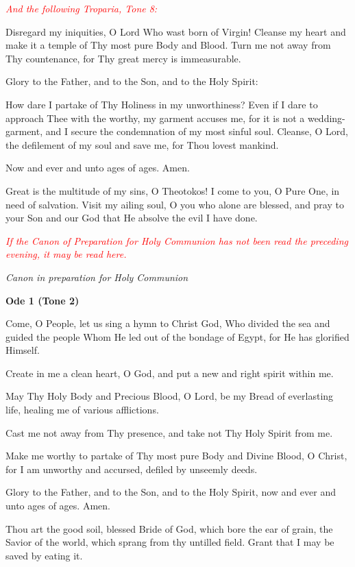 \textcolor{red}{\textit{And the following Troparia, Tone 8:}}

Disregard my iniquities, O Lord Who wast born of Virgin! Cleanse my heart and make it a temple of Thy most pure Body and Blood. Turn me not away from Thy countenance, for Thy great mercy is immeasurable.

Glory to the Father, and to the Son, and to the Holy Spirit: 

How dare I partake of Thy Holiness in my unworthiness? Even if I dare to approach Thee with the worthy, my garment accuses me, for it is not a wedding-garment, and I secure the condemnation of my most sinful soul. Cleanse, O Lord, the defilement of my soul and save me, for Thou lovest mankind.

Now and ever and unto ages of ages. Amen.

Great is the multitude of my sins, O Theotokos! I come to you, O Pure One, in need of salvation. Visit my ailing soul, O you who alone are blessed, and pray to your Son and our God that He absolve the evil I have done.


\textcolor{red}{\textit{If the Canon of Preparation for Holy Communion has not been read the preceding evening, it may be read here.}}

\begin{center}
\textit{Canon in preparation for Holy Communion}
\end{center}

\begin{center}
\textbf{Ode 1 (Tone 2)}
\end{center}

\begin{hang}
\noindent{}Come, O People, let us sing a hymn to Christ God, Who divided the sea and guided the people Whom He led out of the bondage of Egypt, for He has glorified Himself.

Create in me a clean heart, O God, and put a new and right spirit within me.

May Thy Holy Body and Precious Blood, O Lord, be my Bread of everlasting life, healing me of various afflictions.

Cast me not away from Thy presence, and take not Thy Holy Spirit from me. 

Make me worthy to partake of Thy most pure Body and Divine Blood, O Christ, for I am unworthy and accursed, defiled by unseemly deeds.

Glory to the Father, and to the Son, and to the Holy Spirit, now and ever and unto ages of ages. Amen.

Thou art the good soil, blessed Bride of God, which bore the ear of grain, the Savior of the world, which sprang from thy untilled field. Grant that I may be saved by eating it.

\end{hang}

